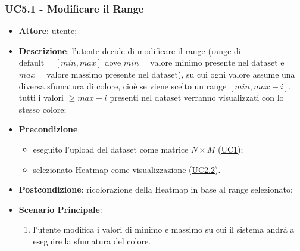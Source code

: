     \subsubsection{UC5.1 - Modificare il Range}
    \label{uc5.1}
    \begin{itemize}
    \item \textbf{Attore}: utente;
    \item \textbf{Descrizione}: l'utente decide di modificare il range (range di $\textrm{default}=[min, max]$ dove $min=\textrm{valore minimo presente nel dataset}$ e $max=\textrm{valore massimo presente nel dataset}$), su cui ogni valore assume una diversa sfumatura di colore, cioè se viene scelto un range $[min, max-i]$, tutti i valori $\geq max-i$ presenti nel dataset verranno visualizzati con lo stesso colore;
    \item \textbf{Precondizione}: 
    \begin{itemize}
        \item eseguito l'upload del dataset come matrice $N\times M$ (\hyperref[uc1]{UC1});
        \item selezionato Heatmap come visualizzazione (\hyperref[uc2.2]{UC2.2}).
    \end{itemize}  
    \item \textbf{Postcondizione}: ricolorazione della Heatmap in base al range selezionato;
    \item \textbf{Scenario Principale}: 
    \begin{enumerate}
        \item l'utente modifica i valori di minimo e massimo su cui il sistema andrà a eseguire la sfumatura del colore.
    \end{enumerate}  
    \end{itemize}
    
    
